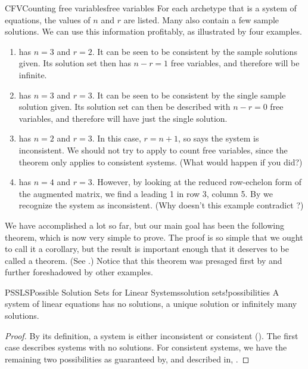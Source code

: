 \begin{example}{CFV}{Counting free variables}{free variables}
For each archetype that is a system of equations, the values of $n$ and $r$ are listed.  Many also contain a few sample solutions.  We can use this information profitably, as illustrated by four examples.
%
\begin{enumerate}
%
\item {} has $n=3$ and $r=2$.  It can be seen to be consistent by the sample solutions given.  Its solution set then has $n-r=1$ free variables, and therefore will be infinite.
%
\item {} has $n=3$ and $r=3$.  It can be seen to be consistent by the single sample solution given.  Its solution set can then be described with $n-r=0$ free variables, and therefore will have just the single solution.
%
\item {} has $n=2$ and $r=3$.  In this case, $r=n+1$, so  says the system is inconsistent.  We should not try to apply  to count free variables, since the theorem only applies to consistent systems. (What would happen if you did?)
%
\item {} has $n=4$ and $r=3$.  However, by looking at the reduced row-echelon form of the augmented matrix, we find a leading 1 in row 3, column 5.  By  we recognize the system as inconsistent.  (Why doesn't this example contradict ?)
%
\end{enumerate}
%
\end{example}
%
We have accomplished a lot so far, but our main goal has been the following theorem, which is now very simple to prove.  The proof is so simple that we ought to call it a corollary, but the result is important enough that it deserves to be called a theorem.    (See .)  Notice that this theorem was presaged first by  and further foreshadowed by other examples.
%
\begin{theorem}{PSSLS}{Possible Solution Sets for Linear Systems}{solution sets!possibilities}
A system of linear equations has no solutions, a unique solution or infinitely many solutions.
\end{theorem}
%
\begin{proof}
By its definition, a system is either inconsistent or consistent ().  The first case describes systems with no solutions.  For consistent systems, we have the remaining two possibilities as guaranteed by, and described in, .
\end{proof}
